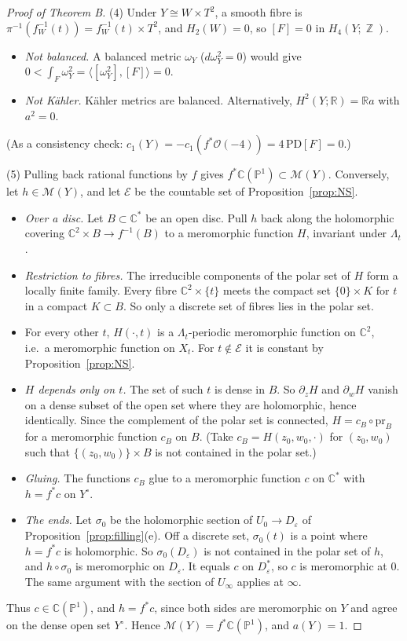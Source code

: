 \documentclass{article}
\DeclareMathOperator{\Z}{\mathbb{Z}}
\theoremstyle{definition}
\theoremstyle{plain}
\newcommand{\R}{\mathbb{R}}
\newcommand{\C}{\mathbb{C}}
\newcommand{\PP}{\mathbb{P}}
\newcommand{\cO}{\mathcal{O}}
\newcommand{\Yo}{Y^{\circ}}
\begin{document}
\begin{proof}[Proof of Theorem B]
(4) Under $Y\cong W\times T^2$, a smooth fibre is $\pi^{-1}(f_W^{-1}(t))=f_W^{-1}(t)\times T^2$,
and $H_2(W)=0$, so $[F]=0$ in $H_4(Y;\Z)$.
\begin{itemize}
\item \emph{Not balanced.} A balanced metric $\omega_Y$ ($d\omega_Y^2=0$) would give
  $0<\int_F\omega_Y^2=\langle[\omega_Y^2],[F]\rangle=0$.
\item \emph{Not K\"ahler.} K\"ahler metrics are balanced. Alternatively,
  $H^2(Y;\R)=\R a$ with $a^2=0$.
\end{itemize}
(As a consistency check: $c_1(Y)=-c_1(f^*\cO(-4))=4\,\mathrm{PD}[F]=0$.)

(5) Pulling back rational functions by $f$ gives $f^*\C(\PP^1)\subset\mathcal M(Y)$.
Conversely, let $h\in\mathcal M(Y)$, and let $\mathcal E$ be the countable set of
Proposition~\ref{prop:NS}.
\begin{itemize}
\item \emph{Over a disc.} Let $B\subset\C^*$ be an open disc. Pull $h$ back along the
  holomorphic covering $\C^2\times B\to f^{-1}(B)$ to a meromorphic function $H$,
  invariant under $\Lambda_t$.
\item \emph{Restriction to fibres.} The irreducible components of the polar set of $H$
  form a locally finite family. Every fibre $\C^2\times\{t\}$ meets the compact set
  $\{0\}\times K$ for $t$ in a compact $K\subset B$. So only a discrete set of fibres
  lies in the polar set.
\item For every other $t$, $H(\cdot,t)$ is a $\Lambda_t$-periodic meromorphic function
  on $\C^2$, i.e.\ a meromorphic function on $X_t$. For $t\notin\mathcal E$ it is
  constant by Proposition~\ref{prop:NS}.
\item \emph{$H$ depends only on $t$.} The set of such $t$ is dense in $B$. So
  $\partial_zH$ and $\partial_wH$ vanish on a dense subset of the open set where they
  are holomorphic, hence identically. Since the complement of the polar set is
  connected, $H=c_B\circ\mathrm{pr}_B$ for a meromorphic function $c_B$ on $B$. (Take
  $c_B=H(z_0,w_0,\cdot)$ for $(z_0,w_0)$ such that $\{(z_0,w_0)\}\times B$ is not
  contained in the polar set.)
\item \emph{Gluing.} The functions $c_B$ glue to a meromorphic function $c$ on $\C^*$
  with $h=f^*c$ on $\Yo$.
\item \emph{The ends.} Let $\sigma_0$ be the holomorphic section of $U_0\to
  D_\varepsilon$ of Proposition~\ref{prop:filling}(e). Off a discrete set,
  $\sigma_0(t)$ is a point where $h=f^*c$ is holomorphic. So $\sigma_0(D_\varepsilon)$
  is not contained in the polar set of $h$, and $h\circ\sigma_0$ is meromorphic on
  $D_\varepsilon$. It equals $c$ on $D_\varepsilon^*$, so $c$ is meromorphic at $0$. The
  same argument with the section of $U_\infty$ applies at $\infty$.
\end{itemize}
Thus $c\in\C(\PP^1)$, and $h=f^*c$, since both sides are meromorphic on $Y$ and agree on
the dense open set $\Yo$. Hence $\mathcal M(Y)=f^*\C(\PP^1)$, and $a(Y)=1$.
\end{proof}
\end{document}
